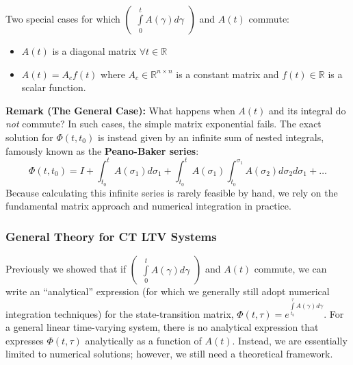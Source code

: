 \documentclass[twoside]{article}
\begin{document}
Two special cases for which $\begin{pmatrix} \int\limits_{0}^{t} A(\gamma) d\gamma \end{pmatrix}$ and $A(t)$ commute:
%
\begin{itemize}
	\item $A(t)$ is a diagonal matrix $\forall t \in \mathbb{R}$
	\item $A(t) = A_c f(t)$ where $A_c \in \mathbb{R}^{n \times n}$ is a constant matrix and $f(t) \in \mathbb{R}$ is a scalar function.
\end{itemize}

\begin{mdframed}[backgroundcolor=yellow!10, linecolor=yellow!50!black, roundcorner=5pt]
\textbf{Remark (The General Case):} What happens when $A(t)$ and its integral do \textit{not} commute? In such cases, the simple matrix exponential fails. The exact solution for $\Phi(t,t_0)$ is instead given by an infinite sum of nested integrals, famously known as the \textbf{Peano-Baker series}:
\begin{equation*}
\Phi(t,t_0) = I + \int_{t_0}^t A(\sigma_1) d\sigma_1 + \int_{t_0}^t A(\sigma_1) \int_{t_0}^{\sigma_1} A(\sigma_2) d\sigma_2 d\sigma_1 + \dots
\end{equation*}
Because calculating this infinite series is rarely feasible by hand, we rely on the fundamental matrix approach and numerical integration in practice.
\end{mdframed}
\vspace{6pt}


\subsubsection{General Theory for CT LTV Systems}

Previously we showed that if $\begin{pmatrix} \int\limits_{0}^{t} A(\gamma) d\gamma \end{pmatrix}$ and $A(t)$ commute, we can write an ``analytical'' expression (for which we generally still adopt numerical integration techniques) for the state-transition matrix, $\Phi(t,\tau) = e^{ \int\limits_{t_0}^{\tau} A(\gamma) d\gamma }$.
For a general linear time-varying system, there is no analytical expression that expresses $\Phi(t,\tau)$ analytically as a function of $A(t)$. Instead, we are essentially limited to numerical solutions; however, we still need a theoretical framework. 
\end{document}
